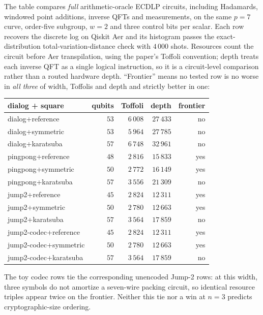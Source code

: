 \documentclass[11pt]{article}
\theoremstyle{plain}
\theoremstyle{remark}
\begin{document}
The table compares \emph{full} arithmetic-oracle ECDLP circuits, including
Hadamards, windowed point additions, inverse QFTs and measurements, on the same
$p=7$ curve, order-five subgroup, $w=2$ and three control bits per scalar.
Each row recovers the discrete log on Qiskit Aer and its histogram passes the
exact-distribution total-variation-distance check with $4\,000$ shots.
Resources count the circuit before Aer transpilation, using the paper's
Toffoli convention; depth treats each inverse QFT as a single logical
instruction, so it is a circuit-level comparison rather than a routed
hardware depth. ``Frontier'' means no tested row is no worse in
\emph{all three} of width, Toffolis and depth and strictly better in one:
\begin{center}\footnotesize\setlength{\tabcolsep}{3pt}
\begin{tabular}{@{}lrrrr@{}}
\toprule
dialog + square & qubits & Toffoli & depth & frontier\\
\midrule
dialog+reference & $53$ & $6\,008$ & $27\,433$ & no\\
dialog+symmetric & $53$ & $5\,964$ & $27\,785$ & no\\
dialog+karatsuba & $57$ & $6\,748$ & $32\,961$ & no\\
pingpong+reference & $48$ & $2\,816$ & $15\,833$ & yes\\
pingpong+symmetric & $50$ & $2\,772$ & $16\,149$ & yes\\
pingpong+karatsuba & $57$ & $3\,556$ & $21\,309$ & no\\
jump2+reference & $45$ & $2\,824$ & $12\,311$ & yes\\
jump2+symmetric & $50$ & $2\,780$ & $12\,663$ & yes\\
jump2+karatsuba & $57$ & $3\,564$ & $17\,859$ & no\\
jump2-codec+reference & $45$ & $2\,824$ & $12\,311$ & yes\\
jump2-codec+symmetric & $50$ & $2\,780$ & $12\,663$ & yes\\
jump2-codec+karatsuba & $57$ & $3\,564$ & $17\,859$ & no\\
\bottomrule
\end{tabular}
\end{center}

The toy codec rows tie the corresponding unencoded Jump-2 rows: at this
width, three symbols do not amortize a seven-wire packing circuit, so
identical resource triples appear twice on the frontier. Neither this tie
nor a win at $n=3$ predicts cryptographic-size ordering.
\end{document}
